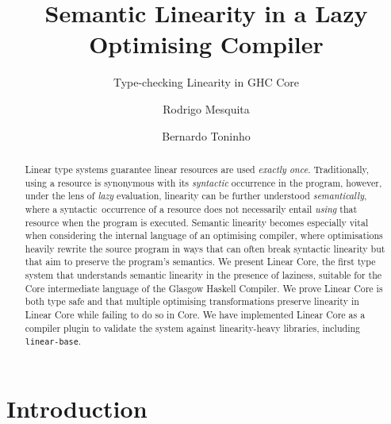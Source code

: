 \documentclass[acmsmall,review,anonymous]{acmart}
\title{Semantic Linearity in a Lazy Optimising Compiler}
\subtitle{Type-checking Linearity in GHC Core}
\author{Rodrigo Mesquita}
\affiliation{
  \department{Departamento de Inform\'{a}tica}
  \institution{FCT-NOVA, Universidade Nova de Lisboa}
  \country{Portugal}}
\affiliation{
   \institution{Well-Typed LLP}
 }
\author{Bernardo Toninho}
\affiliation{
  \department{Departamento de Inform\'{a}tica}
  \institution{NOVA-LINCS, FCT-NOVA, Universidade Nova de Lisboa}
  \country{Portugal}}
\begin{document}
\begin{abstract}
Linear type systems guarantee linear resources are used \emph{exactly once}.
Traditionally, using a resource is synonymous with its \emph{syntactic}
occurrence in the program, however, under the lens of \emph{lazy} evaluation,
linearity can be further understood \emph{semantically}, where a
syntactic occurrence of a resource does not necessarily entail
\emph{using} that resource when the program is executed.
Semantic linearity becomes especially vital when considering the
internal language of an optimising compiler, where optimisations
heavily rewrite the source program in ways that can often break
syntactic linearity but that aim to preserve the program's semantics.
%
We present Linear Core, the first type system that understands semantic
linearity in the presence of laziness, suitable for the Core intermediate
language of the Glasgow Haskell Compiler. We prove Linear Core is both type
safe and that multiple optimising transformations preserve linearity in Linear
Core while failing to do so in Core. We have implemented Linear Core as a
compiler plugin to validate the system against linearity-heavy libraries,
including \texttt{linear-base}.%
\end{abstract}

\maketitle

\section{Introduction}\label{sec:intro}

\end{document}
